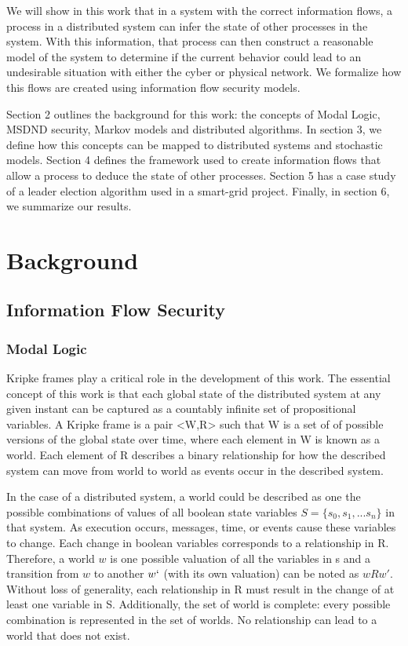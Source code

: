 \documentclass[12pt,oneside]{article}
\begin{document}
We will show in this work that in a system with the correct information flows, a process in a distributed system can infer the state of other processes in the system. With this information, that process can then construct a reasonable model of the system to determine if the current behavior could lead to an undesirable situation with either the cyber or physical network. We formalize how this flows are created using information flow security models.

Section 2 outlines the background for this work: the concepts of Modal Logic, MSDND security, Markov models and distributed algorithms. In section 3, we define how this concepts can be mapped to distributed systems and stochastic models. Section 4 defines the framework used to create information flows that allow a process to deduce the state of other processes. Section 5 has a case study of a leader election algorithm used in a smart-grid project. Finally, in section 6, we summarize our results.

\section{Background}

\subsection{Information Flow Security}

\subsubsection{Modal Logic}

Kripke frames play a critical role in the development of this work. The essential concept of this work is that each global state of the distributed system at any given instant can be captured as a countably infinite set of propositional variables. A Kripke frame is a pair <W,R> such that W is a set of of possible versions of the global state over time, where each element in W is known as a world. Each element of R describes a binary relationship for how the described system can move from world to world as events occur in the described system.

In the case of a distributed system, a world could be described as one the possible combinations of values of all boolean state variables $S=\{s_0, s_1, ... s_n\}$ in that system. As execution occurs, messages, time, or events cause these variables to change. Each change in boolean variables corresponds to a relationship in R. Therefore, a world $w$ is one possible valuation of all the variables in s and a transition from $w$ to another $w`$ (with its own valuation) can be noted as $wRw'$. Without loss of generality, each relationship in R must result in the change of at least one variable in S. Additionally, the set of world is complete: every possible combination is represented in the set of worlds. No relationship can lead to a world that does not exist.
\end{document}
